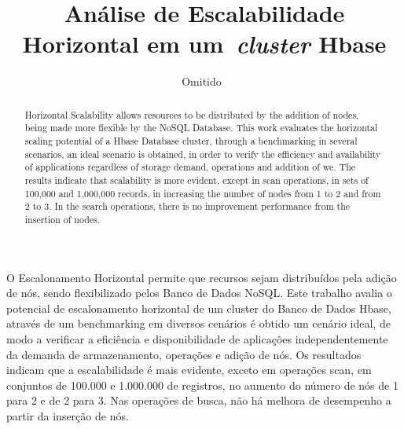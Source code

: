 \documentclass[12pt]{article}
\title{Análise de Escalabilidade Horizontal em um~\emph{cluster}  Hbase}
\author{Omitido~\inst{1}}
\begin{document}
 

\maketitle


\begin{abstract}
Horizontal Scalability allows resources to be distributed by the addition of nodes, being made more flexible by the NoSQL Database. This work evaluates the horizontal scaling potential of a Hbase Database cluster, through a benchmarking in several scenarios, an ideal scenario is obtained, in order to verify the efficiency and availability of applications regardless of storage demand, operations and addition of we. The results indicate that scalability is more evident, except in scan operations, in sets of 100,000 and 1,000,000 records, in increasing the number of nodes from 1 to 2 and from 2 to 3. In the search operations, there is no improvement performance from the insertion of nodes.
\end{abstract}
     
\begin{resumo} 
O Escalonamento Horizontal permite que recursos sejam distribuídos pela adição de nós, sendo flexibilizado pelos Banco de Dados NoSQL. Este trabalho avalia o potencial de escalonamento horizontal de um cluster do Banco de Dados Hbase, através de um benchmarking em diversos cenários é obtido um cenário ideal, de modo a verificar a eficiência e disponibilidade de aplicações independentemente da demanda de armazenamento, operações e adição de nós. Os resultados indicam que a escalabilidade é mais evidente, exceto em operações scan, em conjuntos de 100.000 e 1.000.000 de registros, no aumento do número de nós de 1 para 2 e de 2 para 3. Nas operações de busca, não há melhora de desempenho a partir da inserção de nós.

\end{resumo}
\end{document}
